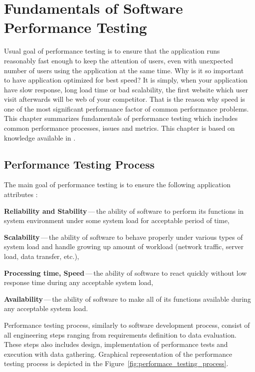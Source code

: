 
\chapter{Fundamentals of Software Performance Testing}
\label{Fundamentals of Software Performance Testing}
Usual goal of performance testing is to ensure that the application runs reasonably fast enough to keep the attention of users, even with unexpected number of users using the application at the same time. Why is it so important to have application optimized for best speed? It is simply, when your application have slow response, long load time or bad scalability, the first website which user visit afterwards will be web of your competitor. That is the reason why speed is one of the most significant performance factor of common performance problems. This chapter summarizes fundamentals of performance testing which includes common performance processes, issues and metrics. This chapter is based on knowledge available in \cite{Molyneaux:TAoAPT, Kurkova:Thesis:2017, DIN:PHD}.


\section{Performance Testing Process}
\label{Performance Testing Process}
The main goal of performance testing is to ensure the following application attributes \cite{GAO:MEASURING}:

\begin{description}
	\setlength\itemsep{0em}
	\item \textbf{Reliability and Stability}\,---\,the ability of software to perform its functions in system environment under some system load for acceptable period of time,
	\item \textbf{Scalability}\,---\,the ability of software to behave properly under various types of system load and handle growing up amount of workload (network traffic, server load, data transfer, etc.),
	\item \textbf{Processing time, Speed}\,---\,the ability of software to react quickly without low response time during any acceptable system load,
	\item \textbf{Availability}\,---\,the ability of software to make all of its functions available during any acceptable system load.
\end{description}

Performance testing process, similarly to software development process, consist of all engineering steps ranging from requirements definition to data evaluation. These steps also includes design, implementation of performance tests and execution with data gathering. Graphical representation of the performance testing process is depicted in the Figure~\ref{fig:performace_testing_process}. 

